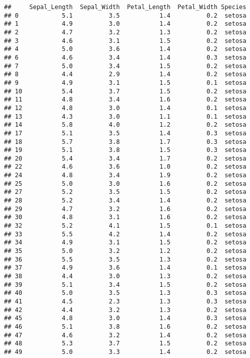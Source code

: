 \documentclass[
]{article}
\begin{document}
\begin{verbatim}
##     Sepal_Length  Sepal_Width  Petal_Length  Petal_Width Species
## 0            5.1          3.5           1.4          0.2  setosa
## 1            4.9          3.0           1.4          0.2  setosa
## 2            4.7          3.2           1.3          0.2  setosa
## 3            4.6          3.1           1.5          0.2  setosa
## 4            5.0          3.6           1.4          0.2  setosa
## 6            4.6          3.4           1.4          0.3  setosa
## 7            5.0          3.4           1.5          0.2  setosa
## 8            4.4          2.9           1.4          0.2  setosa
## 9            4.9          3.1           1.5          0.1  setosa
## 10           5.4          3.7           1.5          0.2  setosa
## 11           4.8          3.4           1.6          0.2  setosa
## 12           4.8          3.0           1.4          0.1  setosa
## 13           4.3          3.0           1.1          0.1  setosa
## 14           5.8          4.0           1.2          0.2  setosa
## 17           5.1          3.5           1.4          0.3  setosa
## 18           5.7          3.8           1.7          0.3  setosa
## 19           5.1          3.8           1.5          0.3  setosa
## 20           5.4          3.4           1.7          0.2  setosa
## 22           4.6          3.6           1.0          0.2  setosa
## 24           4.8          3.4           1.9          0.2  setosa
## 25           5.0          3.0           1.6          0.2  setosa
## 27           5.2          3.5           1.5          0.2  setosa
## 28           5.2          3.4           1.4          0.2  setosa
## 29           4.7          3.2           1.6          0.2  setosa
## 30           4.8          3.1           1.6          0.2  setosa
## 32           5.2          4.1           1.5          0.1  setosa
## 33           5.5          4.2           1.4          0.2  setosa
## 34           4.9          3.1           1.5          0.2  setosa
## 35           5.0          3.2           1.2          0.2  setosa
## 36           5.5          3.5           1.3          0.2  setosa
## 37           4.9          3.6           1.4          0.1  setosa
## 38           4.4          3.0           1.3          0.2  setosa
## 39           5.1          3.4           1.5          0.2  setosa
## 40           5.0          3.5           1.3          0.3  setosa
## 41           4.5          2.3           1.3          0.3  setosa
## 42           4.4          3.2           1.3          0.2  setosa
## 45           4.8          3.0           1.4          0.3  setosa
## 46           5.1          3.8           1.6          0.2  setosa
## 47           4.6          3.2           1.4          0.2  setosa
## 48           5.3          3.7           1.5          0.2  setosa
## 49           5.0          3.3           1.4          0.2  setosa
\end{verbatim}
\end{document}
